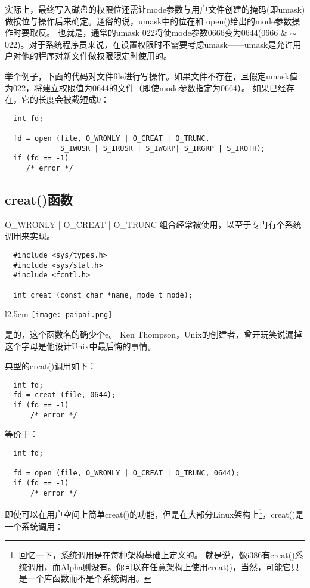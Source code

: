 实际上，最终写入磁盘的权限位还需让mode参数与用户文件创建的掩码(即umask)做按位与操作后来确定。通俗的说，umask中的位在和 open()给出的mode参数操作时要取反。 也就是，通常的umask 022将使mode参数0666变为0644(0666 \& $\sim$022)。对于系统程序员来说，在设置权限时不需要考虑umask——umask是允许用户对他的程序对新文件做权限限定时使用的。

举个例子，下面的代码对文件file进行写操作。如果文件不存在，且假定umask值为022，将建立权限值为0644的文件（即使mode参数指定为0664）。 如果已经存在，它的长度会被截短成0： 
\begin{lstlisting}
  int fd;
 
  fd = open (file, O_WRONLY | O_CREAT | O_TRUNC,
             S_IWUSR | S_IRUSR | S_IWGRP| S_IRGRP | S_IROTH);
  if (fd == -1)
     /* error */
\end{lstlisting}

\subsection{creat()函数}
O\_WRONLY | O\_CREAT | O\_TRUNC 组合经常被使用，以至于专门有个系统调用来实现。 

\begin{lstlisting}
  #include <sys/types.h>
  #include <sys/stat.h>
  #include <fcntl.h>

  int creat (const char *name, mode_t mode);
\end{lstlisting}
\par
\begin{wrapfigure}{l}{2.5cm}
  \texttt{[image: paipai.png]}
\end{wrapfigure}
\mbox{}\begin{flushleft}是的，这个函数名的确少个e。 Ken Thompson，Unix的创建者，曾开玩笑说漏掉这个字母是他设计Unix中最后悔的事情。\end{flushleft} 
\par
典型的creat()调用如下： 
\begin{lstlisting}
  int fd;
  fd = creat (file, 0644);
  if (fd == -1)
      /* error */
\end{lstlisting}

等价于： 

\begin{lstlisting}
  int fd;

  fd = open (file, O_WRONLY | O_CREAT | O_TRUNC, 0644);
  if (fd == -1)
      /* error */
\end{lstlisting}

即使可以在用户空间上简单creat()的功能，但是在大部分Linux架构上\footnote[1]{回忆一下，系统调用是在每种架构基础上定义的。 就是说，像i386有creat()系统调用，而Alpha则没有。你可以在任意架构上使用creat()，当然，可能它只是一个库函数而不是个系统调用。}，creat()是一个系统调用： 

